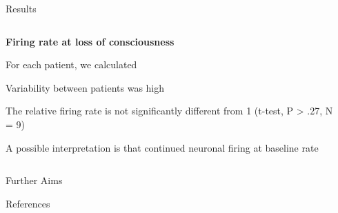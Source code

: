 \documentclass{beamer}
\renewcommand{\emph}{\textbf}
\newenvironment{wideitemize}{\itemize\addtolength{\itemsep}{.2em}\addtolength{\labelsep}{.1ex}}{\enditemize}
\begin{document}
\begin{frame}[t]
\begin{columns}[T]
\begin{column}{.32\linewidth}
\begin{block}{Results}
\begin{columns}[T]
\begin{column}{.95\linewidth}
\begin{wideitemize}
\end{wideitemize}

\end{column}
\end{columns}
\vspace{2em}


\begin{columns}[T]
\begin{column}{.45\linewidth}
\emph{Firing rate at loss of consciousness}
\begin{wideitemize}
\item For each patient, we calculated
\item Variability between patients was high
\item The relative firing rate is not significantly different from 1 (t-test, P > .27, N = 9)
\item A possible interpretation is that continued neuronal firing at baseline rate
\end{wideitemize}
\end{column}
\begin{column}{.4\linewidth}

\end{column}

\end{columns}
\end{block}
\begin{block}{Further Aims}
\begin{wideitemize}
\item
\item 
\end{wideitemize}
\end{block}
\begin{block}{References}
\begin{columns}[T]
\begin{column}{.8\linewidth}
\appto\bibfont{\small}\printbibliography
\vspace{2.68ex}
\end{column}
\end{columns}
\end{block}

\end{column}
\end{columns}

\end{frame}
\end{document}
